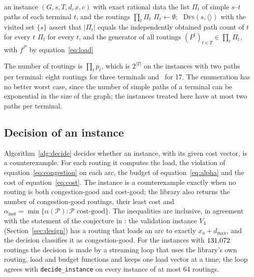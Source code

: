 \documentclass[11pt]{article}
\theoremstyle{remark}
\newcommand{\dmax}{d_{\max}}
\newcommand{\flow}{f}
\begin{document}
\begin{algorithm}[t]
\caption{Simple paths and routings of an instance. The routings are generated in a fixed terminal order and never stored together when
the instance is large; the load vector of a routing is computed on demand.}
\label{alg:enum}
\begin{algorithmic}[1]
\Require an instance $(G,s,T,d,x,c)$ with exact rational data
\Ensure the list $\Pi_t$ of simple $s$--$t$ paths of each terminal $t$, and the routings $\prod_{t}\Pi_t$
  \State $\Pi_t\gets\emptyset$; \ \textsc{Dfs}$(s,\langle\rangle)$ with the visited set $\{s\}$
\EndFor
\State assert that $|\Pi_t|$ equals the independently obtained path count of $t$ for every $t$
\State \Return $\Pi_t$ for every $t$, and the generator of all routings $(P^t)_{t\in T}\in\prod_t\Pi_t$, with $\flow^{\mathcal P}$ by equation~\eqref{eq:load}
\end{algorithmic}
\end{algorithm}

The number of routings is $\prod_tp_t$, which is $2^{|T|}$ on the instances with two paths per terminal: eight routings for
three terminals and \nkroutings\ for 17. The enumeration has no better worst case, since the number of simple paths of a terminal can be
exponential in the size of the graph; the instances treated here have at most two paths per terminal.

\subsection{Decision of an instance}
\label{sec:decide}

Algorithm~\ref{alg:decide} decides whether an instance, with its given cost vector, is a counterexample. For each routing it computes
the load, the violation of equation~\eqref{eq:congestion} on each arc, the budget of equation~\eqref{eq:alpha} and the cost of
equation~\eqref{eq:cost}. The instance is a counterexample exactly when no routing is both congestion-good and cost-good; the library
also returns the number of congestion-good routings, their least cost and $\alpha_{\mathrm{inst}}=\min\{\alpha(\mathcal P)\colon\mathcal P
\text{ cost-good}\}$. The inequalities are inclusive, in agreement with the statement of the conjecture in \cite{STVZ25}: the validation instance $V_4$ (Section~\ref{sec:design}) has a routing that loads an arc to exactly
$x_a+\dmax$, and the decision classifies it as congestion-good. For the instances with $131{,}072$ routings the decision is made by
a streaming loop that uses the library's own routing, load and budget functions and keeps one load vector at a time; the loop agrees with
\texttt{decide\_instance} on every instance of at most 64 routings.
\end{document}
